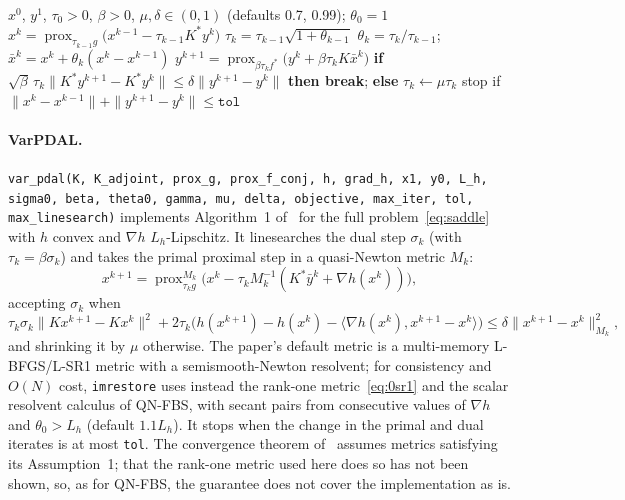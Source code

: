 \documentclass[11pt,a4paper]{article}
\newcommand{\code}[1]{\texttt{#1}}
\newcommand{\prox}{\operatorname{prox}}
\begin{document}
\begin{algorithm}[ht]
\caption{PDAL (\code{pdal})}
\label{alg:pdal}
\begin{algorithmic}[1]
\Require $x^0$, $y^1$, $\tau_0>0$, $\beta>0$, $\mu,\delta\in(0,1)$ (defaults
0.7, 0.99); $\theta_0=1$
  \State $x^k = \prox_{\tau_{k-1}g}\bigl(x^{k-1}-\tau_{k-1}K^*y^k\bigr)$
  \State $\tau_k = \tau_{k-1}\sqrt{1+\theta_{k-1}}$
  \Repeat \Comment{at most \code{max\_linesearch} times}
    \State $\theta_k=\tau_k/\tau_{k-1}$;\quad
      $\bar x^k = x^k + \theta_k(x^k-x^{k-1})$
    \State $y^{k+1} = \prox_{\beta\tau_kf^*}\bigl(y^k+\beta\tau_kK\bar x^k\bigr)$
    \State \textbf{if} $\sqrt\beta\,\tau_k\|K^*y^{k+1}-K^*y^k\|\le
      \delta\|y^{k+1}-y^k\|$ \textbf{then break}; \textbf{else}
      $\tau_k\gets\mu\tau_k$
  \State stop if $\|x^k-x^{k-1}\|+\|y^{k+1}-y^k\|\le\code{tol}$
\EndFor
\end{algorithmic}
\end{algorithm}

\paragraph{VarPDAL.} \code{var\_pdal(K, K\_adjoint, prox\_g, prox\_f\_conj,
h, grad\_h, x1, y0, L\_h, sigma0, beta, theta0, gamma, mu, delta, objective,
max\_iter, tol, max\_linesearch)} implements Algorithm~1
of~\cite{WangFadiliOchs2024} for the full problem~\eqref{eq:saddle} with
$h$ convex and $\nabla h$ $L_h$-Lipschitz. It linesearches the dual step
$\sigma_k$ (with $\tau_k=\beta\sigma_k$) and takes the primal proximal step
in a quasi-Newton metric $M_k$:
\[
  x^{k+1} = \prox^{M_k}_{\tau_kg}\bigl(x^k - \tau_kM_k^{-1}(K^*\bar y^k +
  \nabla h(x^k))\bigr),
\]
accepting $\sigma_k$ when
\[
  \tau_k\sigma_k\|Kx^{k+1}-Kx^k\|^2 + 2\tau_k\bigl(h(x^{k+1})-h(x^k)-
  \langle\nabla h(x^k),x^{k+1}-x^k\rangle\bigr) \le
  \delta\|x^{k+1}-x^k\|^2_{M_k},
\]
and shrinking it by $\mu$ otherwise. The paper's default metric is a
multi-memory L-BFGS/L-SR1 metric with a semismooth-Newton resolvent; for
consistency and $O(N)$ cost, \texttt{imrestore} uses instead the rank-one
metric~\eqref{eq:0sr1} and the scalar resolvent calculus of QN-FBS, with
secant pairs from consecutive values of $\nabla h$ and
$\theta_0>L_h$ (default $1.1L_h$). It stops when the change in the primal
and dual iterates is at most \code{tol}. The convergence theorem
of~\cite{WangFadiliOchs2024} assumes metrics satisfying its Assumption~1;
that the rank-one metric used here does so has not been shown, so, as for
QN-FBS, the guarantee does not cover the implementation as is.
\end{document}
